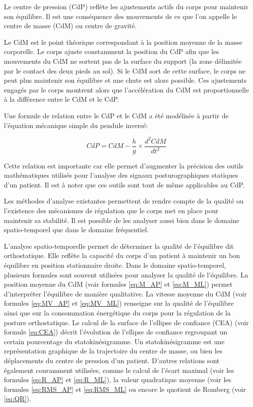 Le centre de pression (CdP) reflète les ajustements actifs du corps pour maintenir son équilibre. 
Il est une conséquence des mouvements de ce que l'on appelle le centre de masse (CdM) ou centre de gravité. 

Le CdM est le point théorique correspondant à la position moyenne de la masse corporelle. 
Le corps ajuste constamment la position du CdP afin que les mouvements du CdM ne sortent pas de la surface du support (la zone délimitée par le contact des deux pieds au sol). 
Si le CdM sort de cette surface, le corps ne peut plus maintenir son équilibre et une chute est alors possible.
Ces ajustements engagés par le corps montrent alors que l’accélération du CdM est proportionnelle à la différence entre le CdM et le CdP.

Une formule de relation entre le CdP et le CdM a été modélisée à partir de l’équation mécanique simple du pendule inversé:

\begin{equation}
    CdP = CdM - \frac{h}{g} \times \frac{d^2 CdM}{dt^2} 
\end{equation}

Cette relation est importante car elle permet d’augmenter la précision des outils mathématiques utilisés pour l’analyse des signaux posturographiques statiques d’un patient. 
Il est à noter que ces outils sont tout de même applicables au CdP.

Les méthodes d'analyse existantes permettent de rendre compte de la qualité ou l'existence des mécanismes de régulation que le corps met en place pour maintenir sa stabilité. 
Il est possible de les analyser aussi bien dans le domaine spatio-temporel que dans le domaine fréquentiel.

L’analyse spatio-temporelle permet de déterminer la qualité de l’équilibre dit orthostatique. 
Elle reflète la capacité du corps d’un patient à maintenir un bon équilibre en position stationnaire droite. 
Dans le domaine spatio-temporel, plusieurs formules sont souvent utilisées pour analyser la qualité de l’équilibre. 
La position moyenne du CdM (voir formules \ref{eq:M_AP} et \ref{eq:M_ML}) permet d’interpréter l’équilibre de manière qualitative. 
La vitesse moyenne du CdM (voir formules \ref{eq:MV_AP} et \ref{eq:MV_ML}) renseigne sur la qualité de l’équilibre ainsi que sur la consommation énergétique du corps pour la régulation de la posture orthostatique. 
Le calcul de la surface de l’ellipse de confiance (CEA) (voir formule \ref{eq:CEA}) décrit l’évolution de l’ellipse de confiance regroupant un certain pourcentage du statokinésigramme. 
Un statokinésigramme est une représentation graphique de la trajectoire du centre de masse, ou bien les déplacements du centre de pression d’un patient. 
D’autres relations sont également couramment utilisées, comme le calcul de l’écart maximal (voir les formules \ref{eq:R_AP} et \ref{eq:R_ML}), la valeur quadratique moyenne (voir les formules \ref{eq:RMS_AP} et \ref{eq:RMS_ML} ou encore le quotient de Romberg (voir \ref{eq:QR}).


